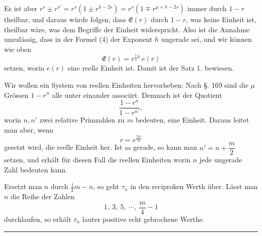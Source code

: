Es ist aber $r^s \pm r^{s'} = r^s (1 \pm r^{h-2s}) = r^s (1 \mp r^{\mu+h-2s})$ immer durch $1 - r$ theilbar, und daraus würde folgen, dass $\mathfrak{E}(r)$ durch $1 - r$, was keine Einheit ist, theilbar wäre, was dem Begriffe der Einheit widerspricht. Also ist die Annahme unzulässig, dass in der Formel (4) der Exponent $h$ ungerade sei, und wir können wie oben
\[
\mathfrak{E}(r) = r^{\tfrac12 h}\, e(r)
\]
setzen, worin $e(r)$ eine reelle Einheit ist. Damit ist der Satz 1. bewiesen.

Wir wollen ein System von reellen Einheiten hervorheben: Nach §. 169 sind die $\mu$ Grössen $1 - r^n$ alle unter einander associirt. Demnach ist der Quotient
\[
\frac{1 - r^n}{1 - r^{n'}},
\]
worin $n, n'$ zwei relative Primzahlen zu $m$ bedeuten, eine Einheit. Daraus leitet man aber, wenn
\[
r = e^{\frac{2\pi i}{m}}
\]
gesetzt wird, die reelle Einheit
her. Ist $m$ gerade, so kann man $n' = n + \dfrac{m}{2}$ setzen, und erhält für diesen Fall die reellen Einheiten
worin $n$ jede ungerade Zahl bedeuten kann.

Ersetzt man $n$ durch $\tfrac{1}{2} m - n$, so geht $\tau_n$ in den reciproken Werth über. Lässt man $n$ die Reihe der Zahlen
\[
1,\ 3,\ 5,\ \cdots,\ \frac{m}{4} - 1
\]
durchlaufen, so erhält $\tau_n$ lauter positive echt gebrochene Werthe.

\begin{center}
\rule{0.2\linewidth}{0.4pt}
\end{center}
